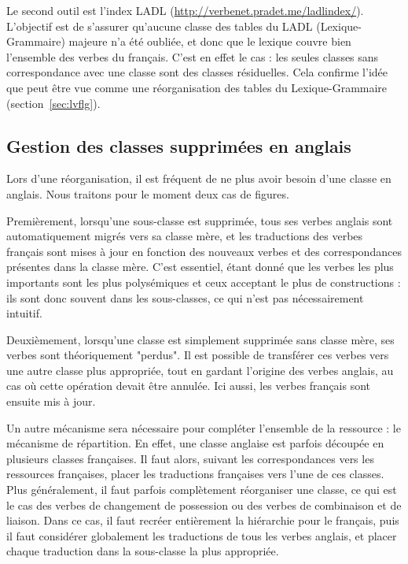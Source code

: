 Le second outil est l'index LADL (\url{http://verbenet.pradet.me/ladlindex/}).
L'objectif est de s'assurer qu'aucune classe des tables du LADL
(Lexique-Grammaire) majeure n'a été oubliée, et donc que le lexique couvre bien
l'ensemble des verbes du français. C'est en effet le cas : les seules classes
sans correspondance avec une classe \verbenet{} sont des classes résiduelles.
Cela confirme l'idée que \verbenet{} peut être vue comme une réorganisation des
tables du Lexique-Grammaire (section~\ref{sec:lvflg}).

\subsection{Gestion des classes supprimées en anglais}

Lors d'une réorganisation, il est fréquent de ne plus avoir besoin d'une classe
en anglais. Nous traitons pour le moment deux cas de figures.

Premièrement, lorsqu'une sous-classe est supprimée, tous ses verbes anglais
sont automatiquement migrés vers sa classe mère, et les traductions des verbes
français sont mises à jour en fonction des nouveaux verbes et des
correspondances présentes dans la classe mère. C'est essentiel, étant donné que
les verbes les plus importants sont les plus polysémiques et ceux acceptant le
plus de constructions : ils sont donc souvent dans les sous-classes, ce qui
n'est pas nécessairement intuitif.

Deuxièmement, lorsqu'une classe est simplement supprimée sans classe mère, ses
verbes sont théoriquement "perdus". Il est possible de transférer ces verbes
vers une autre classe plus appropriée, tout en gardant l'origine des verbes
anglais, au cas où cette opération devait être annulée. Ici aussi, les verbes
français sont ensuite mis à jour.

Un autre mécanisme sera nécessaire pour compléter l'ensemble de la ressource :
le mécanisme de répartition. En effet, une classe anglaise est parfois découpée
en plusieurs classes françaises. Il faut alors, suivant les correspondances
vers les ressources françaises, placer les traductions françaises vers l'une de
ces classes. Plus généralement, il faut parfois complètement réorganiser une
classe, ce qui est le cas des verbes de changement de possession ou des verbes
de combinaison et de liaison. Dans ce cas, il faut recréer entièrement la
hiérarchie pour le français, puis il faut considérer globalement les
traductions de tous les verbes anglais, et placer chaque traduction dans la
sous-classe la plus appropriée.

